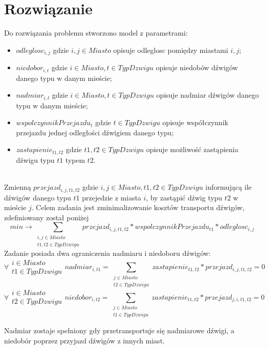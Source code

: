 \section{Rozwiązanie}
Do rozwiązania problemu stworzono model z parametrami: 
\begin{itemize}
    \item $odleglosc_{i,j}$ gdzie $i,j \in Miasto$ opisuje odleglosc pomiędzy miastami $i, j$;
    \item $niedobor_{i,t}$ gdzie $i \in Miasto, t \in TypDzwigu$ opisuje niedobów dźwigów danego typu w danym mieście;
    \item $nadmiar_{i,t}$ gdzie $i \in Miasto, t \in TypDzwigu$ opisuje nadmiar dźwigów danego typu w danym mieście;
    \item $wspolczynnikPrzejazdu_{t}$ gdzie $t \in TypDzwigu$ opisuje współczynnik przejazdu jednej odległości dźwigiem danego typu;
    \item $zastapienie_{t1, t2}$ gdzie $t1, t2 \in TypDzwigu$ opisuje możliwość zastąpienia dźwigu typu $t1$ typem $t2$.
\end{itemize}
\   \\
Zmienną $przejazd_{i,j,t1,t2}$ gdzie $i,j \in Miasto, t1, t2 \in TypDzwigu$ informującą ile dźwigów danego typu $t1$
przejedzie z miasta $i$, by zastąpić dźwig typu $t2$ w mieście $j$. 
Celem zadania jest zminimalizowanie kosztów transportu dźwigów, zdefiniowany został poniżej
$$min \rightarrow  \sum_{\substack{i,j \in Miasto\\ t1,t2 \in TypDzwigu}} przejazd_{i,j,t1,t2} * wspolczynnikPrzejazdu_{t1} * odleglosc_{i,j}$$
Zadanie posiada dwa ograniczenia nadmiaru i niedoboru dźwigów:
$$\forall \substack{i \in Miasto\\ t1 \in TypDzwigu} nadmiar_{i,t1} = \sum_{\substack{j \in Miasto\\ t2 \in TypDzwigu}} zastapienie_{t1,t2} * przejazd_{i,j,t1,t2} = 0$$
$$\forall \substack{i \in Miasto\\ t2 \in TypDzwigu} niedobor_{i,t2} = \sum_{\substack{j \in Miasto\\ t1 \in TypDzwigu}} zastapienie_{t1,t2} * przejazd_{j,i,t1,t2} = 0$$

Nadmiar zostaje spełniony gdy przetransportuje się nadmiarowe dźwigi, a niedobór poprzez przyjazd dźwigów z innych miast.


